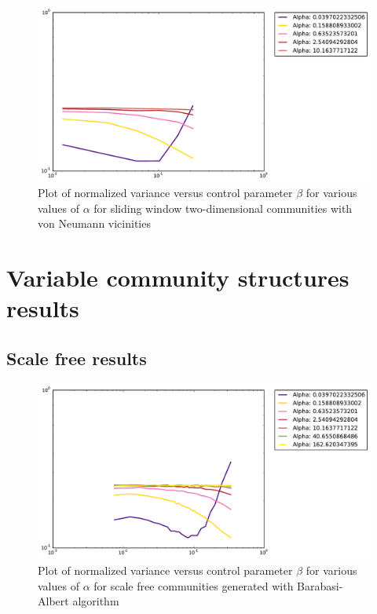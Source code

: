 \begin{figure}[h]
\begin{center}
\includegraphics[scale=0.4]{images/results/vicinity_vonNeumann_n403_rounds10000_partial.pdf}
\caption{Plot of normalized variance versus control parameter $\beta$ for various values of $\alpha$  for sliding window two-dimensional communities with von Neumann vicinities}
\label{fig:von neumann vicinity partial}
\end{center}
\end{figure}


\section{Variable community structures results}
\label{sec:hierarchical}

\subsection{Scale free results}

\begin{figure}[h]
\begin{center}
\includegraphics[scale=0.4]{images/results/vicinity_Barabasi_n403_rounds10000_partial.pdf}
\caption{Plot of normalized variance versus control parameter $\beta$ for various values of $\alpha$  for scale free communities generated with Barabasi-Albert algorithm}
\label{fig:scale free vicinity partial}
\end{center}
\end{figure}


